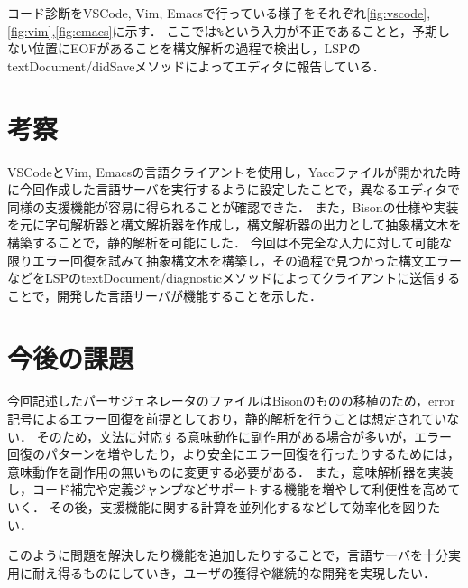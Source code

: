 \documentclass[fontsize=9bp,twocolumn,column_gap=2.36zw,a4paper,report]{jlreq}
\begin{document}
コード診断をVSCode, Vim, Emacsで行っている様子をそれぞれ\ref{fig:vscode},\ref{fig:vim},\ref{fig:emacs}に示す．
ここでは\texttt{\%}という入力が不正であることと，予期しない位置にEOFがあることを構文解析の過程で検出し，LSPのtextDocument/didSaveメソッドによってエディタに報告している．

\begin{figure}[h]
\end{figure}
\begin{figure}[h]
\end{figure}
\begin{figure}[h]
\end{figure}

\chapter{考察}

VSCodeとVim, Emacsの言語クライアントを使用し，Yaccファイルが開かれた時に今回作成した言語サーバを実行するように設定したことで，異なるエディタで同様の支援機能が容易に得られることが確認できた．
また，Bisonの仕様や実装を元に字句解析器と構文解析器を作成し，構文解析器の出力として抽象構文木を構築することで，静的解析を可能にした．
今回は不完全な入力に対して可能な限りエラー回復を試みて抽象構文木を構築し，その過程で見つかった構文エラーなどをLSPのtextDocument/diagnosticメソッドによってクライアントに送信することで，開発した言語サーバが機能することを示した．
\newline

\chapter{今後の課題}

今回記述したパーサジェネレータのファイルはBisonのものの移植のため，error記号によるエラー回復を前提としており，静的解析を行うことは想定されていない．
そのため，文法に対応する意味動作に副作用がある場合が多いが，エラー回復のパターンを増やしたり，より安全にエラー回復を行ったりするためには，意味動作を副作用の無いものに変更する必要がある．
また，意味解析器を実装し，コード補完や定義ジャンプなどサポートする機能を増やして利便性を高めていく．
その後，支援機能に関する計算を並列化するなどして効率化を図りたい．\par
このように問題を解決したり機能を追加したりすることで，言語サーバを十分実用に耐え得るものにしていき，ユーザの獲得や継続的な開発を実現したい．
\newline
\end{document}
